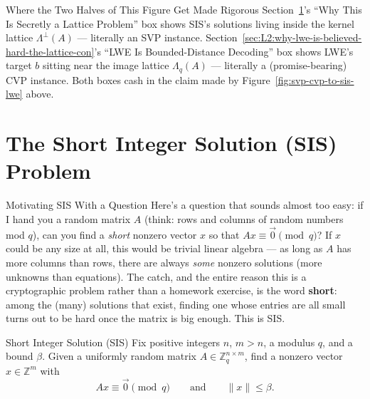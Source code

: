 \begin{rmkbox}{Where the Two Halves of This Figure Get Made Rigorous}
Section~\ref{sec:L2:the-short-integer-solution-sis-problem}'s ``Why This Is Secretly a Lattice Problem'' box shows SIS's solutions living inside the kernel lattice $\Lambda^\perp(A)$ --- literally an SVP instance. Section~\ref{sec:L2:why-lwe-is-believed-hard-the-lattice-con}'s ``LWE Is Bounded-Distance Decoding'' box shows LWE's target $b$ sitting near the image lattice $\Lambda_q(A)$ --- literally a (promise-bearing) CVP instance. Both boxes cash in the claim made by Figure~\ref{fig:svp-cvp-to-sis-lwe} above.
\end{rmkbox}

\section{The Short Integer Solution (SIS) Problem}
\label{sec:L2:the-short-integer-solution-sis-problem}

\begin{rmkbox}{Motivating SIS With a Question}
Here's a question that sounds almost too easy: if I hand you a random matrix $A$ (think: rows and columns of random numbers mod $q$), can you find a \emph{short} nonzero vector $x$ so that $Ax \equiv \vec 0 \pmod q$? If $x$ could be any size at all, this would be trivial linear algebra --- as long as $A$ has more columns than rows, there are always \emph{some} nonzero solutions (more unknowns than equations). The catch, and the entire reason this is a cryptographic problem rather than a homework exercise, is the word \textbf{short}: among the (many) solutions that exist, finding one whose entries are all small turns out to be hard once the matrix is big enough. This is SIS.
\end{rmkbox}

\begin{defbox}{Short Integer Solution (SIS)}
Fix positive integers $n$, $m > n$, a modulus $q$, and a bound $\beta$. Given a uniformly random matrix $A \in \mathbb{Z}_q^{n \times m}$, find a nonzero vector $x \in \mathbb{Z}^m$ with
$$
A x \equiv \vec{0} \pmod q \qquad \text{and} \qquad \|x\| \le \beta.
$$
\end{defbox}

